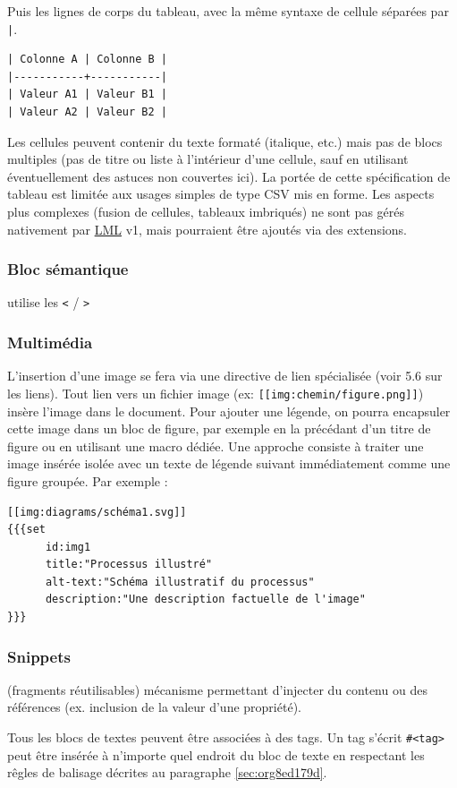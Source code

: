 \documentclass[a4paper,12pt]{article}
\def\sout#1{#1}%
\begin{document}
Puis les lignes de corps du tableau, avec la même syntaxe de cellule séparées par \texttt{|}.

\begin{verbatim}
| Colonne A | Colonne B |
|-----------+-----------|
| Valeur A1 | Valeur B1 |
| Valeur A2 | Valeur B2 |
\end{verbatim}

Les cellules peuvent contenir du texte formaté (italique, etc.) \sout{mais pas de blocs multiples (pas de titre ou liste à l’intérieur d’une cellule, sauf en utilisant éventuellement des astuces non couvertes ici).} La portée de cette spécification de tableau est \sout{limitée aux usages simples de type CSV mis en forme.} Les aspects plus complexes (fusion de cellules, tableaux imbriqués) \sout{ne sont pas gérés nativement par \protect\hyperlink{gls-2}{\label{gls-2-use-14}LML} v1, mais pourraient être ajoutés via des extensions}.
\subsubsection{Bloc sémantique}
\label{sec:org6d0c700}
utilise les \texttt{<} / \texttt{>}
\subsubsection{Multimédia}
\label{sec:org848f36c}
L’insertion d’une image se fera via une directive de lien spécialisée (voir 5.6 sur les liens). Tout lien vers un fichier image (ex: \texttt{[[img:chemin/figure.png]]}) insère l’image dans le document. Pour ajouter une légende, on pourra encapsuler cette image dans un bloc de figure, par exemple en la précédant d’un titre de figure ou en utilisant une macro dédiée. Une approche consiste à traiter une image insérée isolée avec un texte de légende suivant immédiatement comme une figure groupée. Par exemple :
\begin{verbatim}
[[img:diagrams/schéma1.svg]]  
{{{set
      id:img1
      title:"Processus illustré"
      alt-text:"Schéma illustratif du processus"
      description:"Une description factuelle de l'image"
}}}
\end{verbatim}
\subsubsection{Snippets}
\label{sec:orgdb7c6d2}
(fragments réutilisables) mécanisme permettant d’injecter du contenu ou des références (ex. inclusion de la valeur d’une propriété).

Tous les blocs de textes peuvent être associées à des tags.
Un tag s'écrit \texttt{\#<tag>} peut être insérée à n'importe quel endroit du bloc de texte en respectant les rêgles de balisage décrites au paragraphe \ref{sec:org8ed179d}.
\end{document}
